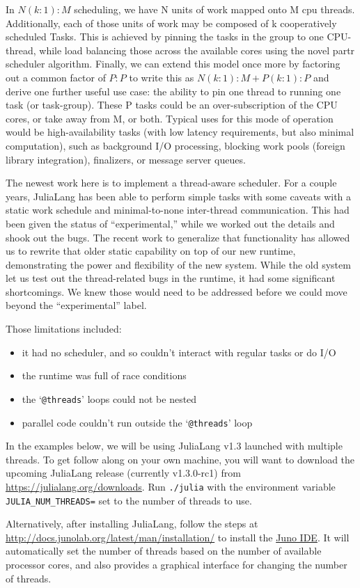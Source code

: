 \documentclass{juliacon}
\begin{document}
In $N(k:1):M$ scheduling, we have N units of work mapped onto M cpu threads. Additionally, each of those units of work may be composed of k cooperatively scheduled Tasks. This is achieved by pinning the tasks in the group to one CPU-thread, while load balancing those across the available cores using the novel partr scheduler algorithm. Finally, we can extend this model once more by factoring out a common factor of $P:P$ to write this as $N(k:1):M+P(k:1):P$ and derive one further useful use case: the ability to pin one thread to running one task (or task-group). These P tasks could be an over-subscription of the CPU cores, or take away from M, or both. Typical uses for this mode of operation would be high-availability tasks (with low latency requirements, but also minimal computation), such as background I/O processing, blocking work pools (foreign library integration), finalizers, or message server queues.

The newest work here is to implement a thread-aware scheduler. For a couple years, JuliaLang has been able to perform simple tasks with some caveats with a static work schedule and minimal-to-none inter-thread communication. This had been given the status of ``experimental,'' while we worked out the details and shook out the bugs. The recent work to generalize that functionality has allowed us to rewrite that older static capability on top of our new runtime, demonstrating the power and flexibility of the new system. While the old system let us test out the thread-related bugs in the runtime, it had some significant shortcomings. We knew those would need to be addressed before we could move beyond the ``experimental'' label.

Those limitations included:
\begin{itemize}
\item it had no scheduler, and so couldn't interact with regular tasks or do I/O
\item the runtime was full of race conditions
\item the `\verb|@threads|' loops could not be nested
\item parallel code couldn't run outside the `\verb|@threads|' loop
\end{itemize}

\begin{calloutbox}
In the examples below, we will be using JuliaLang v1.3 launched with multiple threads.
To get follow along on your own machine, you will want to download the upcoming JuliaLang release (currently v1.3.0-rc1) from \url{https://julialang.org/downloads}.
Run \verb|./julia| with the environment variable \verb|JULIA_NUM_THREADS=| set to the number of threads to use.

Alternatively, after installing JuliaLang, follow the steps at \url{http://docs.junolab.org/latest/man/installation/} to install the \href{https://junolab.org}{Juno IDE}. It will automatically set the number of threads based on the number of available processor cores, and also provides a graphical interface for changing the number of threads.
\end{calloutbox}
\end{document}
